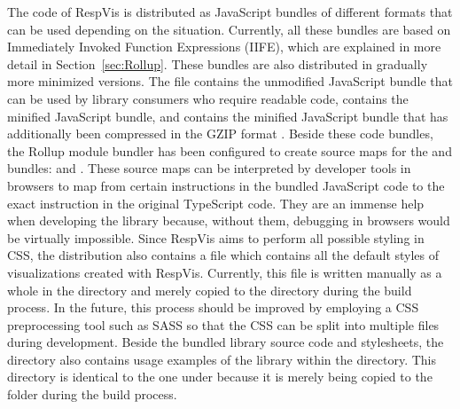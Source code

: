 The code of RespVis is distributed as JavaScript bundles of different formats that can be used depending on the situation.
Currently, all these bundles are based on Immediately Invoked Function Expressions (IIFE), which are explained in more detail in Section~\ref{sec:Rollup}.
These bundles are also distributed in gradually more minimized versions.
The  file contains the unmodified JavaScript bundle that can be used by library consumers who require readable code,  contains the minified JavaScript bundle, and  contains the minified JavaScript bundle that has additionally been compressed in the GZIP format \parencite{GZIP}.
Beside these code bundles, the Rollup module bundler has been configured to create source maps for the  and  bundles:  and .
These source maps can be interpreted by developer tools in browsers to map from certain instructions in the bundled JavaScript code to the exact instruction in the original TypeScript code.
They are an immense help when developing the library because, without them, debugging in browsers would be virtually impossible.
Since RespVis aims to perform all possible styling in CSS, the distribution also contains a  file which contains all the default styles of visualizations created with RespVis. 
Currently, this file is written manually as a whole in the  directory and merely copied to the  directory during the build process.
In the future, this process should be improved by employing a CSS preprocessing tool such as SASS \parencite{SASS} so that the CSS can be split into multiple files during development.
Beside the bundled library source code and stylesheets, the  directory also contains usage examples of the library within the  directory.
This directory is identical to the one under  because it is merely being copied to the  folder during the build process.




